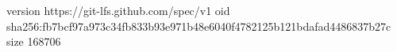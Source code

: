 version https://git-lfs.github.com/spec/v1
oid sha256:fb7bcf97a973c34fb833b93e971b48e6040f4782125b121bdafad4486837b27c
size 168706
